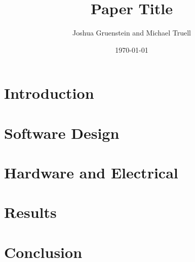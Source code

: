\documentclass[a4paper,12pt]{article}
\title{Paper Title}
\author{Joshua Gruenstein and Michael Truell}
\date{\today}
\begin{document}
\maketitle



\section{Introduction}



\section{Software Design}



\section{Hardware and Electrical}



\section{Results}



\section{Conclusion}



\pagebreak

\end{document}
